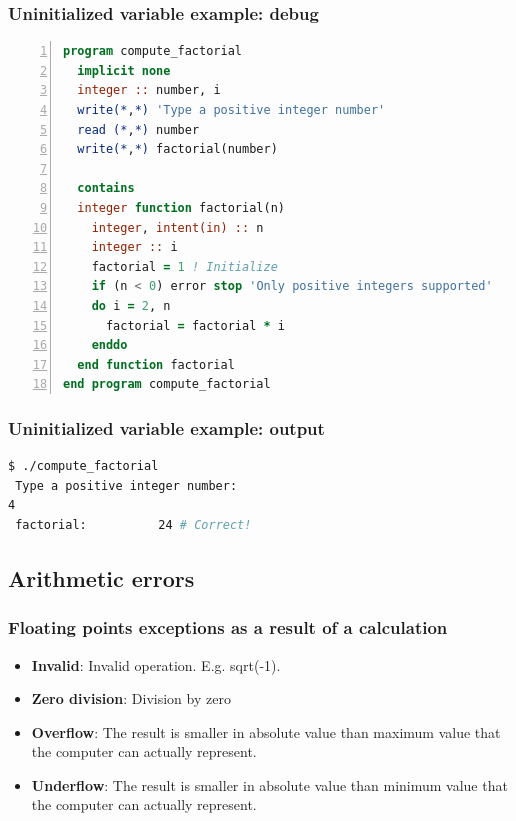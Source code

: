 \documentclass[t]{myBeamer}
\begin{document}
\begin{frame}[fragile,t]
\frametitle{ Uninitialized variable example: debug }
\vspace{-10pt}
\begin{lstlisting}[language=fortran,numbers=left]
program compute_factorial
  implicit none 
  integer :: number, i
  write(*,*) 'Type a positive integer number'
  read (*,*) number
  write(*,*) factorial(number)

  contains
  integer function factorial(n)
	integer, intent(in) :: n
	integer :: i
	factorial = 1 ! Initialize
	if (n < 0) error stop 'Only positive integers supported'
	do i = 2, n
	  factorial = factorial * i 
	enddo
  end function factorial
end program compute_factorial
\end{lstlisting}

\end{frame}


\begin{frame}[fragile,t]
\frametitle{ Uninitialized variable example: output }
\vspace{-10pt}
\begin{lstlisting}[language=bash]
$ ./compute_factorial 
 Type a positive integer number:
4
 factorial:          24 # Correct!
\end{lstlisting}

\end{frame}


\subsection{Arithmetic errors}
\begin{frame}[t]
\frametitle{Floating points exceptions as a result of a calculation}
\Large
\centering
  \begin{itemize}
   \item \textbf{Invalid}: Invalid operation. E.g. sqrt(-1).
   \item \textbf{Zero division}: Division by zero
   \item \textbf{Overflow}: The result is smaller in absolute value than maximum value that the computer can actually represent.
   \item \textbf{Underflow}: The result is smaller in absolute value than minimum value that the computer can actually represent.
  \end{itemize}
\end{frame}
\end{document}
